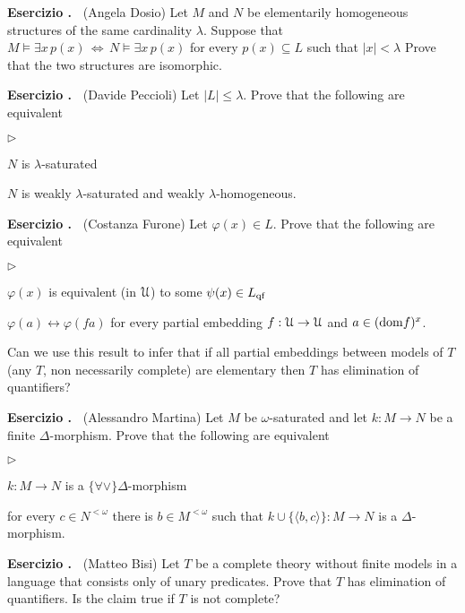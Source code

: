\documentclass[10pt]{article}
\def\phi{\varphi}
\def\U{\EuScript U}
\def\<{\langle}
\def\>{\rangle}
\def\E{\exists}
\def\A{\forall}
\def\imp{\rightarrow}
\def\iff{\leftrightarrow}
\def\IFF{\Leftrightarrow}
\def\dom{{\rm dom}}
\newcommand{\labella}[1]{{\sf\footnotesize #1}\hfill}
\renewenvironment{itemize}
  {\begin{list}{$\triangleright$}{%
   \setlength{\parskip}{0mm}
   \setlength{\topsep}{0mm}
   \setlength{\rightmargin}{0mm}
   \setlength{\listparindent}{0mm}
   \setlength{\itemindent}{0mm}
   \setlength{\labelwidth}{3ex}
   \setlength{\itemsep}{0mm}
   \setlength{\parsep}{0mm}
   \setlength{\partopsep}{0mm}
   \setlength{\labelsep}{1ex}
   \setlength{\leftmargin}{\labelwidth+\labelsep}
   \let\makelabel\labella}}{%
   \vspace*{-.3\baselineskip}
  \end{list}}
\newcounter{ex}
\newenvironment{exercise}{\bigskip\addtocounter{ex}{1}\textbf{Esercizio \theex.\ }}{}
\begin{document}
\begin{exercise}
  (Angela Dosio)
  Let $M$ and $N$ be elementarily homogeneous structures of the same cardinality $\lambda$. 
  Suppose that $M\models\E x\, p(x)\,\IFF\,N\models\E x\, p(x)$ for every $p(x)\subseteq L$ such that $|x|<\lambda$
  Prove that the two structures are isomorphic. 
\end{exercise}

\begin{exercise}
  (Davide Peccioli)
  Let $|L|\le\lambda$. 
  Prove that the following are equivalent\nobreak
  \begin{itemize}
  \item[1.] $N$ is $\lambda$-saturated
  \item[2.] $N$ is weakly $\lambda$-saturated and weakly $\lambda$-homogeneous.
  \end{itemize}\smallskip
\end{exercise}

\begin{exercise}
  (Costanza Furone)
  Let $\phi(x)\in L$.
  Prove that the following are equivalent
  \begin{itemize}
   \item[1.] $\phi(x)$ is equivalent (in $\U$) to some $\psi(x)\in L_{\rm qf}$
   \item[2.] $\phi(a)\iff\phi(fa)$ for every partial embedding $f:\U\to\U$ and $a\in(\dom f)^x$.
  \end{itemize}
  Can we use this result to infer that if all partial embeddings between models of $T$ (any $T$, non necessarily complete) are elementary then $T$ has elimination of quantifiers?
\end{exercise}

\begin{exercise}
  (Alessandro Martina)
  Let $M$ be $\omega$-saturated and let $k:M\imp N$ be a finite $\Delta$-morphism. 
  Prove that the following are equivalent
  \begin{itemize}
  \item[1.] $k:M\imp N$ is a $\{\A\vee\}\Delta$-morphism
  \item[2.] for every $c\in N^{<\omega}$ there is $b\in M^{<\omega}$ such that $k\cup\{\<b,c\>\}:M\imp N$ is a $\Delta$-morphism.
  \end{itemize}
\end{exercise}

\begin{exercise}
  (Matteo Bisi)
  Let $T$ be a complete theory without finite models in a language that consists only of unary predicates. 
  Prove that $T$ has elimination of quantifiers.
  Is the claim true if $T$ is not complete?
\end{exercise}
\end{document}
